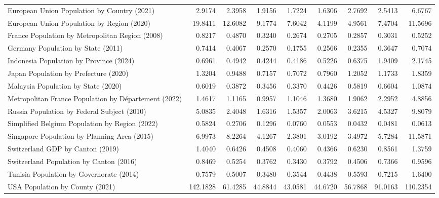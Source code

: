\begin{tabular}{lrrrrrrrr}
              European Union Population by Country (2021) &   2.9174 &  2.3958 &  1.9156 &  1.7224 &  1.6306 &  2.7692 &  2.5413 &   6.6767 \\
               European Union Population by Region (2020) &  19.8411 & 12.6082 &  9.1774 &  7.6042 &  4.1199 &  4.9561 &  7.4704 &  11.5696 \\
          France Population by Metropolitan Region (2008) &   0.8217 &  0.4870 &  0.3240 &  0.2674 &  0.2705 &  0.2857 &  0.3031 &   0.5252 \\
                       Germany Population by State (2011) &   0.7414 &  0.4067 &  0.2570 &  0.1755 &  0.2566 &  0.2355 &  0.3647 &   0.7074 \\
                  Indonesia Population by Province (2024) &   0.6961 &  0.4942 &  0.4244 &  0.4186 &  0.5226 &  0.6375 &  1.9409 &   2.1745 \\
                    Japan Population by Prefecture (2020) &   1.3204 &  0.9488 &  0.7157 &  0.7072 &  0.7960 &  1.2052 &  1.1733 &   1.8359 \\
                      Malaysia Population by State (2020) &   0.6019 &  0.3872 &  0.3456 &  0.3370 &  0.4426 &  0.5819 &  0.6604 &   1.0874 \\
     Metropolitan France Population by Département (2022) &   1.4617 &  1.1165 &  0.9957 &  1.1046 &  1.3680 &  1.9062 &  2.2952 &   4.8856 \\
              Russia Population by Federal Subject (2010) &   5.0835 &  2.4048 &  1.6316 &  1.5357 &  2.0063 &  3.6215 &  4.5327 &   9.8079 \\
           Simplified Belgium Population by Region (2022) &   0.5824 &  0.2706 &  0.1296 &  0.0760 &  0.0553 &  0.0432 &  0.0481 &   0.0613 \\
             Singapore Population by Planning Area (2015) &   6.9973 &  8.2264 &  4.1267 &  2.3801 &  3.0192 &  3.4972 &  5.7284 &  11.5871 \\
                         Switzerland GDP by Canton (2019) &   1.4040 &  0.6426 &  0.4508 &  0.4060 &  0.4366 &  0.6230 &  0.8561 &   1.3759 \\
                  Switzerland Population by Canton (2016) &   0.8469 &  0.5254 &  0.3762 &  0.3430 &  0.3792 &  0.4506 &  0.7366 &   0.9596 \\
                 Tunisia Population by Governorate (2014) &   0.7579 &  0.5007 &  0.3480 &  0.3544 &  0.4438 &  0.5593 &  0.7215 &   1.6400 \\
                          USA Population by County (2021) & 142.1828 & 61.4285 & 44.8844 & 43.0581 & 44.6720 & 56.7868 & 91.0163 & 110.2354 \\

\end{tabular}

